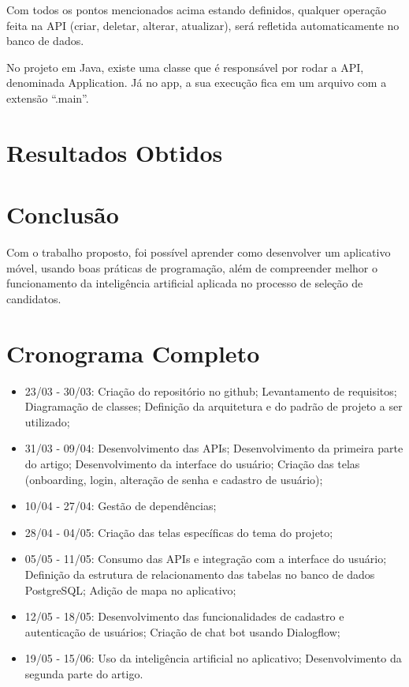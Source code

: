 \documentclass[conference]{IEEEtran}
\begin{document}
Com todos os pontos mencionados acima estando definidos, qualquer operação feita na API (criar, deletar, alterar, atualizar), será refletida automaticamente no banco de dados.

No projeto em Java, existe uma classe que é responsável por rodar a API, denominada Application. Já no app, a sua execução fica em um arquivo com a extensão “.main”.

\section*{Resultados Obtidos}



\section*{Conclusão}
Com o trabalho proposto, foi possível aprender como desenvolver um aplicativo móvel, usando boas práticas de programação, além de compreender melhor o funcionamento da inteligência artificial aplicada no processo de seleção de candidatos.

\section*{Cronograma Completo}

\begin{itemize}
\item 23/03 - 30/03:
\subitem Criação do repositório no github;
\subitem Levantamento de requisitos;
\subitem Diagramação de classes;
\subitem Definição da arquitetura e do padrão de projeto a ser utilizado;
\item 31/03 - 09/04:
\subitem Desenvolvimento das APIs;
\subitem Desenvolvimento da primeira parte do artigo;
\subitem Desenvolvimento da interface do usuário;
\subitem Criação das telas (onboarding, login, alteração de senha e cadastro de usuário);
\item 10/04 - 27/04:
\subitem Gestão de dependências;
\item 28/04 - 04/05:
\subitem Criação das telas específicas do tema do projeto;
\item 05/05 - 11/05: 
\subitem Consumo das APIs e integração com a interface do usuário;
\subitem Definição da estrutura de relacionamento das tabelas no banco de dados PostgreSQL;
\subitem Adição de mapa no aplicativo;
\item 12/05 - 18/05:
\subitem Desenvolvimento das funcionalidades de cadastro e autenticação de usuários; 
\subitem Criação de chat bot usando Dialogflow;
\item 19/05 - 15/06:
\subitem Uso da inteligência artificial no aplicativo;
\subitem Desenvolvimento da segunda parte do artigo.
\end{itemize}
\end{document}
